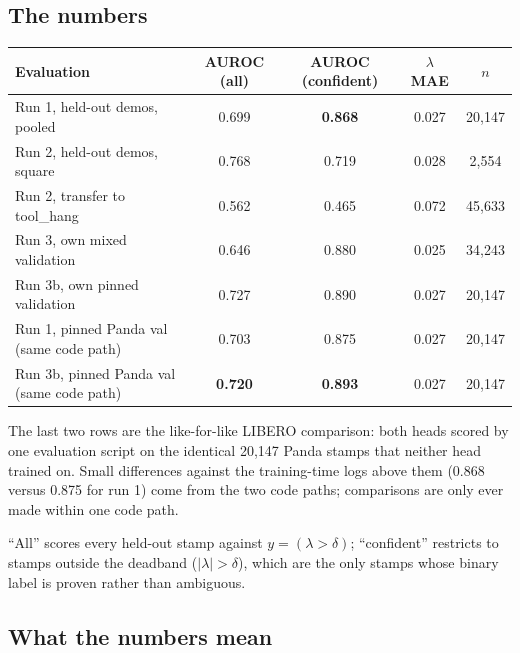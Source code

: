 \documentclass[11pt]{article}
\begin{document}
\subsection{The numbers}

\begin{center}
\small
\begin{tabular}{@{}lcccc@{}}
\toprule
Evaluation & AUROC (all) & AUROC (confident) & $\lambda$ MAE & $n$ \\
\midrule
Run 1, held-out demos, pooled     & 0.699 & \textbf{0.868} & 0.027 & 20{,}147 \\
Run 2, held-out demos, square     & 0.768 & 0.719          & 0.028 & 2{,}554 \\
Run 2, transfer to tool\_hang     & 0.562 & 0.465          & 0.072 & 45{,}633 \\
Run 3, own mixed validation       & 0.646 & 0.880          & 0.025 & 34{,}243 \\
Run 3b, own pinned validation     & 0.727 & 0.890          & 0.027 & 20{,}147 \\
\midrule
Run 1, pinned Panda val (same code path)  & 0.703 & 0.875 & 0.027 & 20{,}147 \\
Run 3b, pinned Panda val (same code path) & \textbf{0.720} & \textbf{0.893} & 0.027 & 20{,}147 \\
\bottomrule
\end{tabular}
\end{center}

The last two rows are the like-for-like LIBERO comparison: both heads scored by
one evaluation script on the identical 20{,}147 Panda stamps that neither head
trained on. Small differences against the training-time logs above them
(0.868 versus 0.875 for run 1) come from the two code paths; comparisons are only
ever made within one code path.

``All'' scores every held-out stamp against $y = (\lambda > \delta)$; ``confident''
restricts to stamps outside the deadband ($|\lambda| > \delta$), which are the only
stamps whose binary label is proven rather than ambiguous.

\subsection{What the numbers mean}
\end{document}
